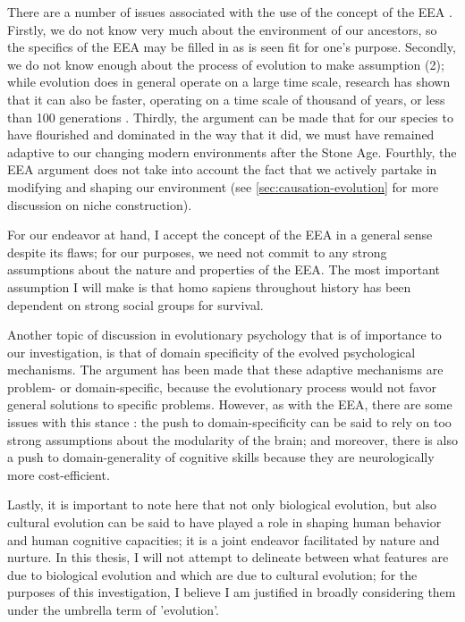 There are a number of issues associated with the use of the concept of the EEA \citep{LB02}. Firstly, we do not know very much about the environment of our ancestors, so the specifics of the EEA may be filled in as is seen fit for one's purpose. Secondly, we do not know enough about the process of evolution to make assumption (2); while evolution does in general operate on a large time scale, research has shown that it can also be faster, operating on a time scale of thousand of years, or less than 100 generations \citep[pp.~190--191 and references therein]{LB02}. Thirdly, the argument can be made that for our species to have flourished and dominated in the way that it did, we must have remained adaptive to our changing modern environments after the Stone Age. Fourthly, the EEA argument does not take into account the fact that we actively partake in modifying and shaping our environment (see \cref{sec:causation-evolution} for more discussion on niche construction).

For our endeavor at hand, I accept the concept of the EEA in a general sense despite its flaws; for our purposes, we need not commit to any strong assumptions about the nature and properties of the EEA. The most important assumption I will make is that homo sapiens throughout history has been dependent on strong social groups for survival.

Another topic of discussion in evolutionary psychology that is of importance to our investigation, is that of domain specificity of the evolved psychological mechanisms. The argument has been made \citep[p.~50]{Buss15} that these adaptive mechanisms are problem- or domain-specific, because the evolutionary process would not favor general solutions to specific problems.
However, as with the EEA, there are some issues with this stance \citep{LB02}: the push to domain-specificity can be said to rely on too strong assumptions about the modularity of the brain; and moreover, there is also a push to domain-generality of cognitive skills because they are neurologically more cost-efficient.

Lastly, it is important to note here that not only biological evolution, but also cultural evolution can be said to have played a role in shaping human behavior and human cognitive capacities; it is a joint endeavor facilitated by nature and nurture. In this thesis, I will not attempt to delineate between what features are due to biological evolution and which are due to cultural evolution; for the purposes of this investigation, I believe I am justified in broadly considering them under the umbrella term of 'evolution'.

